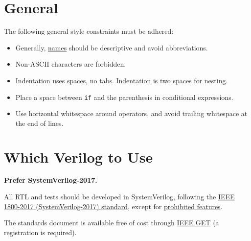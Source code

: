   \section{General}
  \label{summary:general}

    The following general style constraints must be adhered:

    \begin{itemize}
      \item Generally, \hyperref[naming]{names} should be descriptive and avoid abbreviations.
      \item Non-ASCII characters are forbidden.
      \item Indentation uses spaces, no tabs. Indentation is two spaces for nesting.
      \item Place a space between \texttt{if} and the parenthesis in conditional expressions.
      \item Use horizontal whitespace around operators, and avoid trailing whitespace at the end of lines.
    \end{itemize}

  \section{Which Verilog to Use}
  \label{summary:which_verilog_to_use}

    \begin{keybox}
      \textbf{Prefer SystemVerilog-2017.}
    \end{keybox}

    All RTL and tests should be developed in SystemVerilog, following the \href{https://ieeexplore.ieee.org/document/8299595}{IEEE 1800-2017 (SystemVerilog-2017) standard}, except for \hyperref[language_features:problematic_language_features]{prohibited features}.

    The standards document is available free of cost through \href{https://ieeexplore.ieee.org/browse/standards/get-program/page/series?id=80}{IEEE GET} (a registration is required).